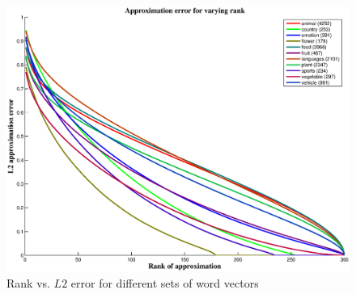 \documentclass[11pt]{article}
\begin{document}
\begin{figure}[t]
\centering
\includegraphics[width=.65\textwidth]{./images/svd_per_class.eps}
\caption{Rank vs. $L2$ error for different sets of word vectors}
\label{fig:svdOnClass}
\end{figure}

\nocite{*}


\end{document}
